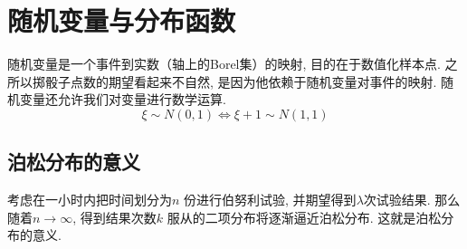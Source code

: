 \chapter{随机变量与分布函数}
随机变量是一个事件到实数（轴上的Borel集）的映射, 目的在于数值化样本点. 之所以掷骰子点数的期望看起来不自然,
是因为他依赖于随机变量对事件的映射.
随机变量还允许我们对变量进行数学运算.
\[
    \xi \sim N(0,1) \iff \xi+1 \sim N(1,1)
\]
\section{泊松分布的意义}

考虑在一小时内把时间划分为\(n\) 份进行伯努利试验, 并期望得到\(\lambda\)次试验结果. 那么随着\(n
\to \infty\), 得到结果次数\(k\) 服从的二项分布将逐渐逼近泊松分布. 这就是泊松分布的意义.
